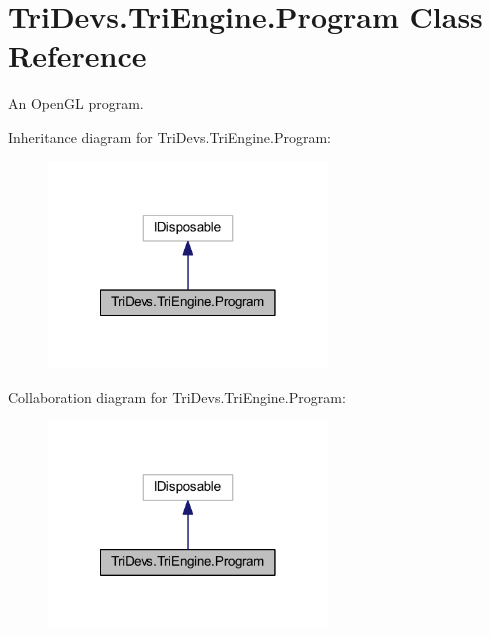 \hypertarget{class_tri_devs_1_1_tri_engine_1_1_program}{\section{Tri\-Devs.\-Tri\-Engine.\-Program Class Reference}
\label{class_tri_devs_1_1_tri_engine_1_1_program}
}


An Open\-G\-L program.  




Inheritance diagram for Tri\-Devs.\-Tri\-Engine.\-Program\-:
\nopagebreak
\begin{figure}[H]
\begin{center}
\leavevmode
\includegraphics[width=210pt]{class_tri_devs_1_1_tri_engine_1_1_program__inherit__graph}
\end{center}
\end{figure}


Collaboration diagram for Tri\-Devs.\-Tri\-Engine.\-Program\-:
\nopagebreak
\begin{figure}[H]
\begin{center}
\leavevmode
\includegraphics[width=210pt]{class_tri_devs_1_1_tri_engine_1_1_program__coll__graph}
\end{center}
\end{figure}
